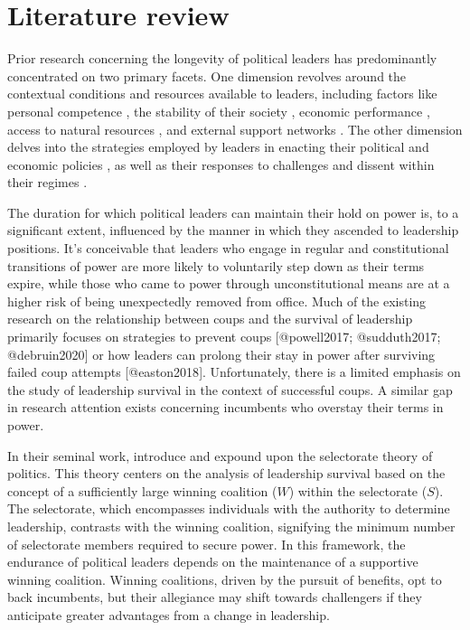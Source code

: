 \documentclass[
  12pt,
  a4paper,
  12pt]{article}
\begin{document}
\hypertarget{literature-review}{%
\section{Literature review}\label{literature-review}}

Prior research concerning the longevity of political leaders has
predominantly concentrated on two primary facets. One dimension revolves
around the contextual conditions and resources available to leaders,
including factors like personal competence \citep{yu2016}, the stability
of their society \citep{arriola2009}, economic performance
\citep[\citet{williams2011}]{palmer1999}, access to natural resources
\citep{smith2004, quirozflores2012}, and external support networks
\citep[\citet{thyne2017}]{licht2009, wright2008}. The other dimension
delves into the strategies employed by leaders in enacting their
political and economic policies \citep{gandhi2007, morrison2009}, as
well as their responses to challenges and dissent within their regimes
\citep{escribà-folch2013, davenport2021}.

The duration for which political leaders can maintain their hold on
power is, to a significant extent, influenced by the manner in which
they ascended to leadership positions. It's conceivable that leaders who
engage in regular and constitutional transitions of power are more
likely to voluntarily step down as their terms expire, while those who
came to power through unconstitutional means are at a higher risk of
being unexpectedly removed from office. Much of the existing research on
the relationship between coups and the survival of leadership primarily
focuses on strategies to prevent coups {[}@powell2017; @sudduth2017;
@debruin2020{]} or how leaders can prolong their stay in power after
surviving failed coup attempts {[}@easton2018{]}. Unfortunately, there
is a limited emphasis on the study of leadership survival in the context
of successful coups. A similar gap in research attention exists
concerning incumbents who overstay their terms in power.

In their seminal work, \citet{buenodemesquita2003} introduce and expound
upon the selectorate theory of politics. This theory centers on the
analysis of leadership survival based on the concept of a sufficiently
large winning coalition (\(W\)) within the selectorate (\(S\)). The
selectorate, which encompasses individuals with the authority to
determine leadership, contrasts with the winning coalition, signifying
the minimum number of selectorate members required to secure power. In
this framework, the endurance of political leaders depends on the
maintenance of a supportive winning coalition. Winning coalitions,
driven by the pursuit of benefits, opt to back incumbents, but their
allegiance may shift towards challengers if they anticipate greater
advantages from a change in leadership.
\end{document}
